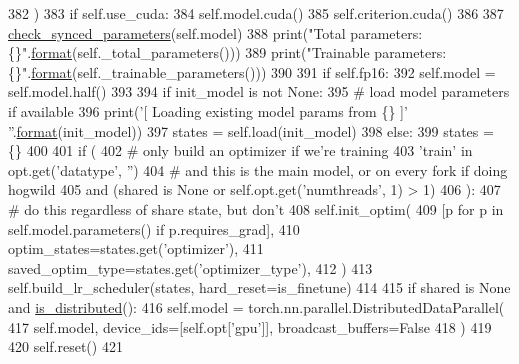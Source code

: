 \begin{DoxyCode}
382                 )
383             \textcolor{keywordflow}{if} self.use\_cuda:
384                 self.model.cuda()
385                 self.criterion.cuda()
386 
387             \hyperlink{namespaceparlai_1_1utils_1_1distributed_afc64140f9a6437dc1a2b2bd4294ba8ef}{check\_synced\_parameters}(self.model)
388             print(\textcolor{stringliteral}{"Total parameters: \{\}"}.\hyperlink{namespaceparlai_1_1chat__service_1_1services_1_1messenger_1_1shared__utils_a32e2e2022b824fbaf80c747160b52a76}{format}(self.\_total\_parameters()))
389             print(\textcolor{stringliteral}{"Trainable parameters:  \{\}"}.\hyperlink{namespaceparlai_1_1chat__service_1_1services_1_1messenger_1_1shared__utils_a32e2e2022b824fbaf80c747160b52a76}{format}(self.\_trainable\_parameters()))
390 
391             \textcolor{keywordflow}{if} self.fp16:
392                 self.model = self.model.half()
393 
394             \textcolor{keywordflow}{if} init\_model \textcolor{keywordflow}{is} \textcolor{keywordflow}{not} \textcolor{keywordtype}{None}:
395                 \textcolor{comment}{# load model parameters if available}
396                 print(\textcolor{stringliteral}{'[ Loading existing model params from \{\} ]'} \textcolor{stringliteral}{''}.\hyperlink{namespaceparlai_1_1chat__service_1_1services_1_1messenger_1_1shared__utils_a32e2e2022b824fbaf80c747160b52a76}{format}(init\_model))
397                 states = self.load(init\_model)
398             \textcolor{keywordflow}{else}:
399                 states = \{\}
400 
401         \textcolor{keywordflow}{if} (
402             \textcolor{comment}{# only build an optimizer if we're training}
403             \textcolor{stringliteral}{'train'} \textcolor{keywordflow}{in} opt.get(\textcolor{stringliteral}{'datatype'}, \textcolor{stringliteral}{''})
404             \textcolor{comment}{# and this is the main model, or on every fork if doing hogwild}
405             \textcolor{keywordflow}{and} (shared \textcolor{keywordflow}{is} \textcolor{keywordtype}{None} \textcolor{keywordflow}{or} self.opt.get(\textcolor{stringliteral}{'numthreads'}, 1) > 1)
406         ):
407             \textcolor{comment}{# do this regardless of share state, but don't}
408             self.init\_optim(
409                 [p \textcolor{keywordflow}{for} p \textcolor{keywordflow}{in} self.model.parameters() \textcolor{keywordflow}{if} p.requires\_grad],
410                 optim\_states=states.get(\textcolor{stringliteral}{'optimizer'}),
411                 saved\_optim\_type=states.get(\textcolor{stringliteral}{'optimizer\_type'}),
412             )
413             self.build\_lr\_scheduler(states, hard\_reset=is\_finetune)
414 
415         \textcolor{keywordflow}{if} shared \textcolor{keywordflow}{is} \textcolor{keywordtype}{None} \textcolor{keywordflow}{and} \hyperlink{namespaceparlai_1_1utils_1_1distributed_a023acb5e3b66e1f27e21247c35661279}{is\_distributed}():
416             self.model = torch.nn.parallel.DistributedDataParallel(
417                 self.model, device\_ids=[self.opt[\textcolor{stringliteral}{'gpu'}]], broadcast\_buffers=\textcolor{keyword}{False}
418             )
419 
420         self.reset()
421 
\end{DoxyCode}


